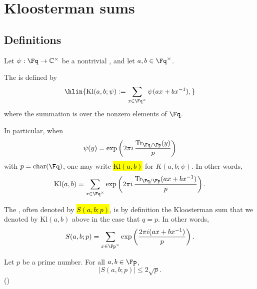 \section{Kloosterman sums}

\subsection{Definitions}

\begin{definition} \label{definition:kloosterman_sum_of_an_additive_character_on_Fq}
    Let $\psi : \Fq \to \mathbb{C}^\times$ be a nontrivial , and let $a,b \in \Fq^\times$.  

    The  is defined by  
    $$\hlin{\mathrm{Kl}(a,b;\psi) := \sum_{x \in \Fq^\times} \psi(ax + b x^{-1}),}$$  
    where the summation is over the nonzero elements of $\Fq$.

    In particular, when 
    $$\psi(y) = \exp\left( 2\pi i\, \frac{\mathrm{Tr}_{\Fq/\Fp}(y)}{p} \right)$$
    with $p = \mathrm{char}(\Fq)$, one may write \hl{$\mathrm{Kl}(a,b)$} for $K(a,b;\psi)$. In other words,
    $$\mathrm{Kl}(a,b) = \sum_{x \in \Fq^\times} \exp\left( 2\pi i\, \frac{\mathrm{Tr}_{\Fq/\Fp}(a x + b x^{-1})}{p} \right).$$

    The , often denoted by \hl{$S(a,b;p)$}, is by definition the Kloosterman sum that we denoted by $\mathrm{Kl}(a,b)$ above in the case that $q = p$. In other words,
    $$S(a,b;p) = \sum_{x \in \Fp^\times} \exp\left( \frac{2\pi i(ax+bx^{-1})}{p} \right).$$
\end{definition}

\begin{proposition}[Weil]
    Let $p$ be a prime number. For all $a,b \in \Fp$,
    $$|S(a,b;p)| \leq 2\sqrt{p}.$$
    ()
\end{proposition}



